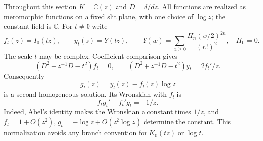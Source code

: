 \documentclass[11pt]{article}
\theoremstyle{definition}
\theoremstyle{remark}
\begin{document}
Throughout this section $K=\mathbb C(z)$ and $D=d/dz$. All functions are
realized as meromorphic functions on a fixed slit plane, with one choice of
$\log z$; the constant field is $\mathbb C$. For $t\ne0$ write
\[
 f_t(z)=I_0(tz),\qquad
 y_t(z)=Y(tz),\qquad
 Y(w)=\sum_{n\ge0}\frac{H_n(w/2)^{2n}}{(n!)^2},
 \quad H_0=0.
\]
The scale $t$ may be complex. Coefficient comparison gives
\[
 (D^2+z^{-1}D-t^2)f_t=0,\qquad
 (D^2+z^{-1}D-t^2)y_t=2f_t'/z.
\]
Consequently
\begin{equation}\label{cf:second}
 g_t(z)=y_t(z)-f_t(z)\log z
\end{equation}
is a second homogeneous solution. Its Wronskian with $f_t$ is
\begin{equation}\label{cf:W}
 f_tg_t'-f_t'g_t=-1/z.
\end{equation}
Indeed, Abel's identity makes the Wronskian a constant times $1/z$,
and $f_t=1+O(z^2)$, $g_t=-\log z+O(z^2\log z)$ determine the constant.
This normalization avoids any branch convention for $K_0(tz)$ or $\log t$.
\end{document}
